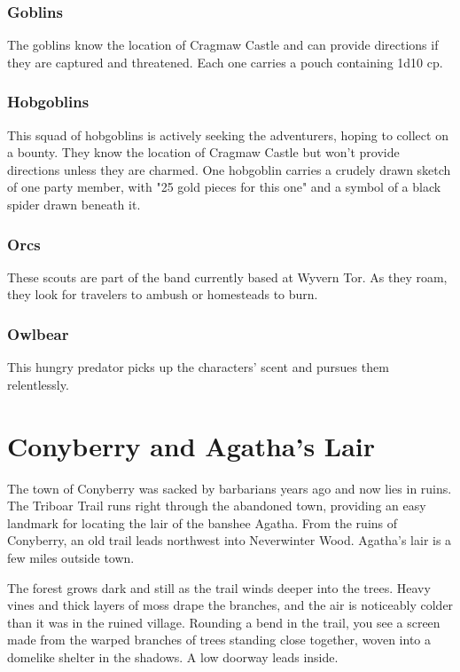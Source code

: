 \documentclass[10pt,a4paper,twoside,bg=print,twocolumn,openany,nodeprecatedcode]{dndbook}
\begin{document}
\subsubsection{Goblins}
The goblins know the location of Cragmaw Castle and can provide directions if they are captured and threatened. Each one carries a pouch containing 1d10 cp.

\subsubsection{Hobgoblins}
This squad of hobgoblins is actively seeking the adventurers, hoping to collect on a bounty. They know the location of Cragmaw Castle but won't provide directions unless they are charmed. One hobgoblin carries a crudely drawn sketch of one party member, with "25 gold pieces for this one" and a symbol of a black spider drawn beneath it.

\subsubsection{Orcs}
These scouts are part of the band currently based at Wyvern Tor. As they roam, they look for travelers to ambush or homesteads to burn.

\subsubsection{Owlbear}
This hungry predator picks up the characters' scent and pursues them relentlessly.

\section{Conyberry and Agatha's Lair}
The town of Conyberry was sacked by barbarians years ago and now lies in ruins. The Triboar Trail runs right through the abandoned town, providing an easy landmark for locating the lair of the banshee Agatha. From the ruins of Conyberry, an old trail leads northwest into Neverwinter Wood. Agatha's lair is a few miles outside town.

\begin{DndReadAloud}{}
The forest grows dark and still as the trail winds deeper into the trees. Heavy vines and thick layers of moss drape the branches, and the air is noticeably colder than it was in the ruined village. Rounding a bend in the trail, you see a screen made from the warped branches of trees standing close together, woven into a domelike shelter in the shadows. A low doorway leads inside.

\end{DndReadAloud}
\end{document}
